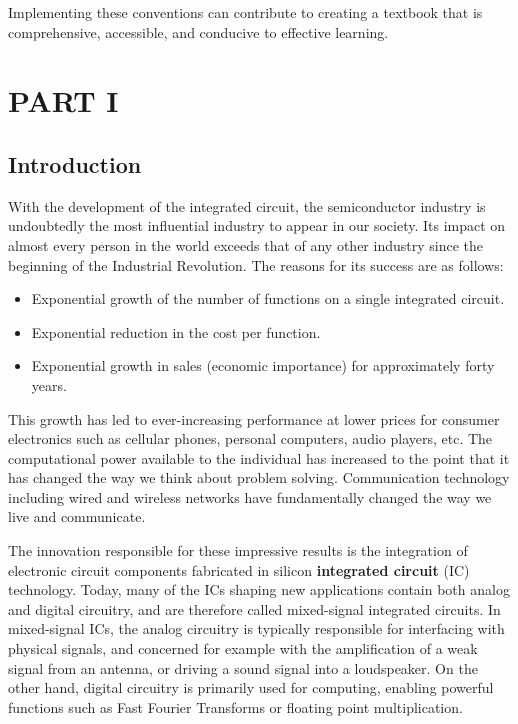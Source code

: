 \documentclass[
  11pt,
  letterpaper,
  abstract]{scrbook}
\begin{document}
Implementing these conventions can contribute to creating a textbook
that is comprehensive, accessible, and conducive to effective learning.

\part{PART I}

\chapter{Introduction}\label{sec-introduction}

With the development of the integrated circuit, the semiconductor
industry is undoubtedly the most influential industry to appear in our
society. Its impact on almost every person in the world exceeds that of
any other industry since the beginning of the Industrial Revolution. The
reasons for its success are as follows:

\begin{itemize}
\item
  Exponential growth of the number of functions on a single integrated
  circuit.
\item
  Exponential reduction in the cost per function.
\item
  Exponential growth in sales (economic importance) for approximately
  forty years.
\end{itemize}

This growth has led to ever-increasing performance at lower prices for
consumer electronics such as cellular phones, personal computers, audio
players, etc. The computational power available to the individual has
increased to the point that it has changed the way we think about
problem solving. Communication technology including wired and wireless
networks have fundamentally changed the way we live and communicate.

The innovation responsible for these impressive results is the
integration of electronic circuit components fabricated in silicon
\textbf{integrated circuit} (IC) technology. Today, many of the ICs
shaping new applications contain both analog and digital circuitry, and
are therefore called mixed-signal integrated circuits. In mixed-signal
ICs, the analog circuitry is typically responsible for interfacing with
physical signals, and concerned for example with the amplification of a
weak signal from an antenna, or driving a sound signal into a
loudspeaker. On the other hand, digital circuitry is primarily used for
computing, enabling powerful functions such as Fast Fourier Transforms
or floating point multiplication.
\end{document}
